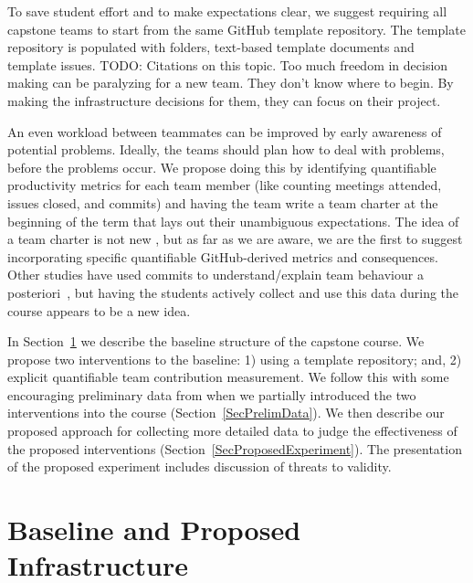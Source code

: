\documentclass[10pt, conference]{IEEEtran}
\begin{document}
To save student effort and to make expectations clear, we suggest
requiring all capstone teams to start from the same GitHub template repository.
The template repository is populated with folders, text-based template documents
and template issues.  TODO: Citations on this
topic. Too much freedom in decision making can be paralyzing for a new team.
They don't know where to begin.  By making the infrastructure decisions for
them, they can focus on their project.

An even workload between teammates can be improved by early awareness of
potential problems. Ideally, the teams should plan how to deal with problems,
before the problems occur.  We propose doing this by identifying quantifiable
productivity metrics for each team member (like counting meetings attended,
issues closed, and commits) and having the team write a team charter at the
beginning of the term that lays out their unambiguous expectations.  The idea of
a team charter is not new \cite{mathieuLayingFoundationSuccessful2009,
johnsonTeamChartersHelp2022, hughstonEmpiricalStudyTeam2013}, but as far as we
are aware, we are the first to suggest incorporating specific quantifiable
GitHub-derived metrics and consequences. Other studies have used commits to
understand/explain team behaviour a
posteriori~\cite{gitinabardStudentTeamworkProgramming2020,
tushevUsingGitHubLarge2020}, but having the students actively collect and use
this data during the course appears to be a new idea.

In Section~\ref{SecInfrastruct} we describe the baseline structure of the
capstone course.  We propose two interventions to the baseline: 1) using a
template repository; and, 2) explicit quantifiable team contribution
measurement. We follow this with some encouraging preliminary data from when we
partially introduced the two interventions into the course
(Section~\ref{SecPrelimData}).  We then describe our proposed approach for
collecting more detailed data to judge the effectiveness of the proposed
interventions (Section~\ref{SecProposedExperiment}). The presentation of the
proposed experiment includes discussion of threats to validity.

\section{Baseline and Proposed Infrastructure} \label{SecInfrastruct}
\end{document}
